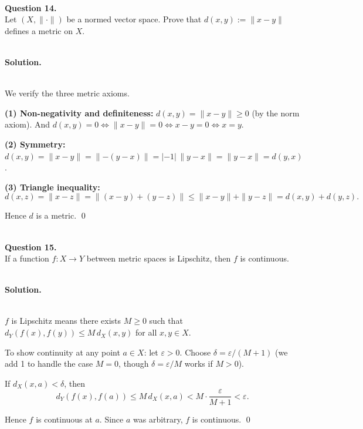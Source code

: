 \documentclass{article}
\begin{document}
\bigskip


\hfill \break  $~\!\!$ \dotfill \medskip \\
\textbf{Question 14.}\\
Let $(X, \|\cdot\|)$ be a normed vector space. Prove that $d(x,y) := \|x - y\|$ defines a metric on $X$.

\noindent\\
\textbf{Solution.}\\
\quad\\
\begin{mdframed}[linewidth=1pt]
We verify the three metric axioms.

\textbf{(1) Non-negativity and definiteness:} $d(x,y) = \|x-y\| \ge 0$ (by the norm axiom). And $d(x,y) = 0 \iff \|x-y\| = 0 \iff x - y = 0 \iff x = y$.

\textbf{(2) Symmetry:} $d(x,y) = \|x - y\| = \|{-(y-x)}\| = |{-1}|\,\|y-x\| = \|y-x\| = d(y,x)$.

\textbf{(3) Triangle inequality:}
\[
d(x,z) = \|x - z\| = \|(x - y) + (y - z)\| \le \|x - y\| + \|y - z\| = d(x,y) + d(y,z).
\]

Hence $d$ is a metric. \qed
\end{mdframed}

\bigskip


\hfill \break  $~\!\!$ \dotfill \medskip \\
\textbf{Question 15.}\\
If a function $f: X \to Y$ between metric spaces is Lipschitz, then $f$ is continuous.

\noindent\\
\textbf{Solution.}\\
\quad\\
\begin{mdframed}[linewidth=1pt]
$f$ is Lipschitz means there exists $M \ge 0$ such that $d_Y(f(x), f(y)) \le M\, d_X(x, y)$ for all $x, y \in X$.

To show continuity at any point $a \in X$: let $\varepsilon > 0$. Choose $\delta = \varepsilon / (M + 1)$ (we add 1 to handle the case $M = 0$, though $\delta = \varepsilon/M$ works if $M > 0$).

If $d_X(x, a) < \delta$, then
\[
d_Y(f(x), f(a)) \le M\, d_X(x, a) < M \cdot \frac{\varepsilon}{M+1} < \varepsilon.
\]

Hence $f$ is continuous at $a$. Since $a$ was arbitrary, $f$ is continuous. \qed
\end{mdframed}
\end{document}
